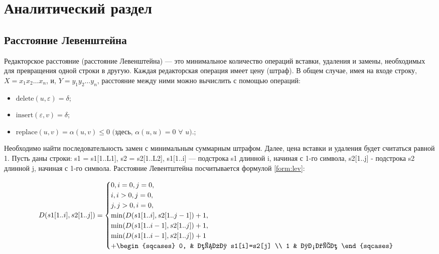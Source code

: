 \chapter{Аналитический раздел}\label{analyth}

\section{Расстояние Левенштейна}\label{defs}

Редакторское расстояние (расстояние Левенштейна) --- это минимальное количество операций вставки, удаления и замены, необходимых для превращения одной строки в другую. Каждая редакторская операция имеет цену (штраф). 
В общем случае, имея на входе строку, $X = x_1x_2 \dots x_n$, и, $Y = y_1y_2 \dots y_n$, расстояние между ними можно вычислить с помощью операций:
\begin{itemize}
	\item ${\text{delete}(u, \varepsilon) = \delta}$;
	\item $\text{insert}(\varepsilon, v) = \delta$;
	\item $\text{replace}(u, v) = \alpha(u, v) \leq 0$  $($здесь, $\alpha(u, u) = 0$ $\forall$ $u).$;
\end{itemize}

Необходимо найти последовательность замен с минимальным суммарным штрафом. Далее, цена вставки и удаления будет считаться равной 1.
 Пусть даны строки: s1 = s1[1..L1], s2 = s2[1..L2], s1[1..i] --- подстрока s1 длинной i, начиная с 1-го символа, s2[1..j] - подстрока s2 длинной j, начиная с 1-го символа. Расстояние Левентштейна посчитывается формулой \ref{form:lev}:
 
\begin{equation}\label{form:lev}
	D(s1[1..i], s2[1..j]) =
	\begin{cases}
		0,        i = 0, j =0,\\
		i,   i > 0, j =0, \\
		j,  j > 0, i = 0, \\
		\min(D(s1[1..i], s2[1..j-1]) + 1,\\ 
		\min(D(s1[1..i-1], s2[1..j]) + 1, \\
		\min(D(s1[1..i-1], s2[1..j]) + 1 \\ + 
		\begin{sqcases}
			0, & если s1[i]=s2[j] \\
			1 & иначе
		\end{sqcases}
	\end{cases}
\end{equation}


